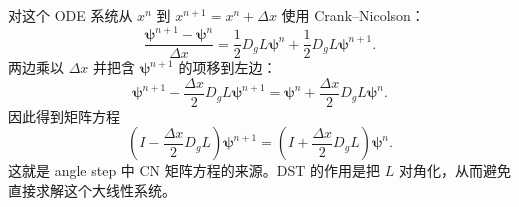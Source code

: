\documentclass[11pt,a4paper]{ctexart}
\begin{document}
对这个 ODE 系统从 \(x^n\) 到 \(x^{n+1}=x^n+\Delta x\) 使用 Crank--Nicolson：
\begin{equation}
  \frac{\boldsymbol\psi^{n+1}-\boldsymbol\psi^n}{\Delta x}
  =
  \frac12D_gL\boldsymbol\psi^n
  +
  \frac12D_gL\boldsymbol\psi^{n+1}.
\end{equation}
两边乘以 \(\Delta x\) 并把含 \(\boldsymbol\psi^{n+1}\) 的项移到左边：
\begin{equation}
  \boldsymbol\psi^{n+1}
  -
  \frac{\Delta x}{2}D_gL\boldsymbol\psi^{n+1}
  =
  \boldsymbol\psi^n
  +
  \frac{\Delta x}{2}D_gL\boldsymbol\psi^n.
\end{equation}
因此得到矩阵方程
\begin{equation}
  \left(
    I-\frac{\Delta x}{2}D_gL
  \right)
  \boldsymbol\psi^{n+1}
  =
  \left(
    I+\frac{\Delta x}{2}D_gL
  \right)
  \boldsymbol\psi^n.
\end{equation}
这就是 angle step 中 CN 矩阵方程的来源。DST 的作用是把 \(L\) 对角化，从而避免直接求解这个大线性系统。
\end{document}
